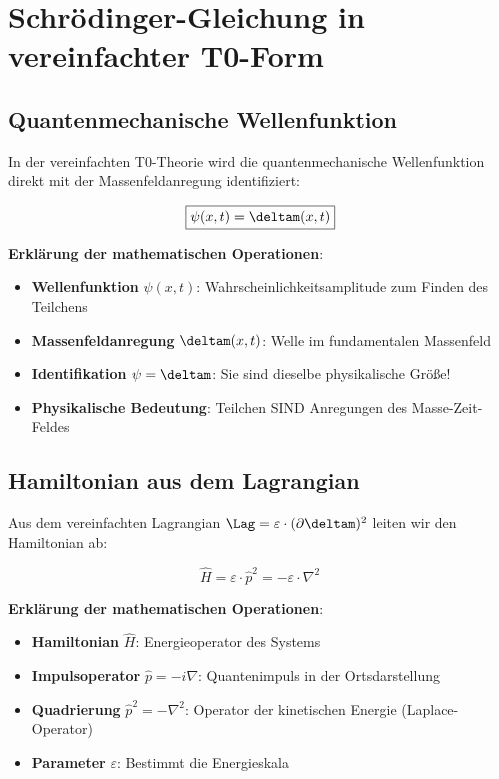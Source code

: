 	\section{Schrödinger-Gleichung in vereinfachter T0-Form}
	
	\subsection{Quantenmechanische Wellenfunktion}
	
	In der vereinfachten T0-Theorie wird die quantenmechanische Wellenfunktion direkt mit der Massenfeldanregung identifiziert:
	
	\begin{equation}
		\boxed{\psi(x,t) = \deltam(x,t)}
		\label{eq:wavefunction_identification}
	\end{equation}
	
	\textbf{Erklärung der mathematischen Operationen}:
	\begin{itemize}
		\item \textbf{Wellenfunktion} $\psi(x,t)$: Wahrscheinlichkeitsamplitude zum Finden des Teilchens
		\item \textbf{Massenfeldanregung} $\deltam(x,t)$: Welle im fundamentalen Massenfeld
		\item \textbf{Identifikation} $\psi = \deltam$: Sie sind dieselbe physikalische Größe!
		\item \textbf{Physikalische Bedeutung}: Teilchen SIND Anregungen des Masse-Zeit-Feldes
	\end{itemize}
	
	\subsection{Hamiltonian aus dem Lagrangian}
	
	Aus dem vereinfachten Lagrangian $\Lag = \varepsilon \cdot (\partial \deltam)^2$ leiten wir den Hamiltonian ab:
	
	\begin{equation}
		\hat{H} = \varepsilon \cdot \hat{p}^2 = -\varepsilon \cdot \nabla^2
		\label{eq:simplified_hamiltonian}
	\end{equation}
	
	\textbf{Erklärung der mathematischen Operationen}:
	\begin{itemize}
		\item \textbf{Hamiltonian} $\hat{H}$: Energieoperator des Systems
		\item \textbf{Impulsoperator} $\hat{p} = -i\nabla$: Quantenimpuls in der Ortsdarstellung
		\item \textbf{Quadrierung} $\hat{p}^2 = -\nabla^2$: Operator der kinetischen Energie (Laplace-Operator)
		\item \textbf{Parameter} $\varepsilon$: Bestimmt die Energieskala
	\end{itemize}
	
